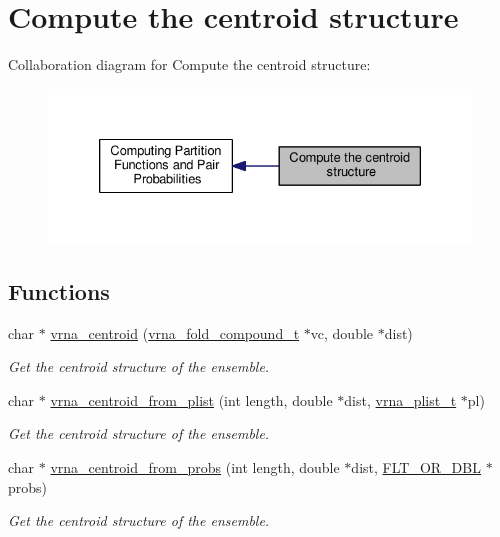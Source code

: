 \hypertarget{group__centroid__fold}{\section{Compute the centroid structure}
\label{group__centroid__fold}
}
Collaboration diagram for Compute the centroid structure\-:
\nopagebreak
\begin{figure}[H]
\begin{center}
\leavevmode
\includegraphics[width=330pt]{group__centroid__fold}
\end{center}
\end{figure}
\subsection*{Functions}
\begin{DoxyCompactItemize}
\item 
char $\ast$ \hyperlink{group__centroid__fold_ga0e64bb67e51963dc71cbd4d30b80a018}{vrna\-\_\-centroid} (\hyperlink{group__fold__compound_ga1b0cef17fd40466cef5968eaeeff6166}{vrna\-\_\-fold\-\_\-compound\-\_\-t} $\ast$vc, double $\ast$dist)
\begin{DoxyCompactList}\small\item\em Get the centroid structure of the ensemble. \end{DoxyCompactList}\item 
char $\ast$ \hyperlink{group__centroid__fold_ga70525a53b879c1427f9ea546c96fa1c5}{vrna\-\_\-centroid\-\_\-from\-\_\-plist} (int length, double $\ast$dist, \hyperlink{group__data__structures_ga8e4eb5e1bfc95776559575beb359af87}{vrna\-\_\-plist\-\_\-t} $\ast$pl)
\begin{DoxyCompactList}\small\item\em Get the centroid structure of the ensemble. \end{DoxyCompactList}\item 
char $\ast$ \hyperlink{group__centroid__fold_ga98193ede06778a9ea966cc8fc43d0804}{vrna\-\_\-centroid\-\_\-from\-\_\-probs} (int length, double $\ast$dist, \hyperlink{group__data__structures_ga31125aeace516926bf7f251f759b6126}{F\-L\-T\-\_\-\-O\-R\-\_\-\-D\-B\-L} $\ast$probs)
\begin{DoxyCompactList}\small\item\em Get the centroid structure of the ensemble. \end{DoxyCompactList}\end{DoxyCompactItemize}


